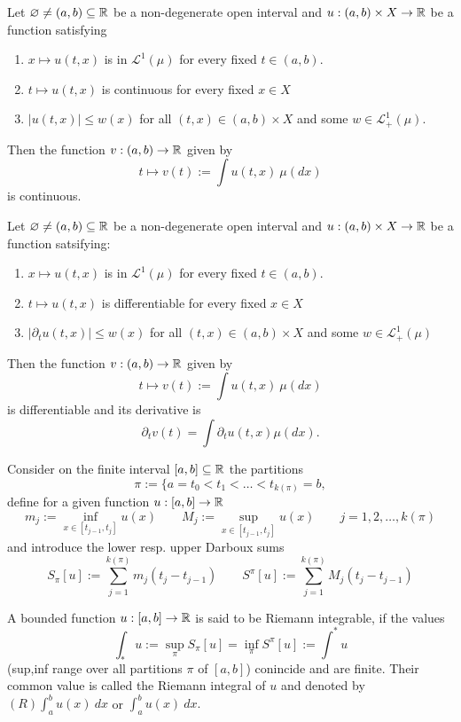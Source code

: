 \begin{thm}
Let \(\varnothing \neq (a,b)\subseteq \Bbb{R}\) be a non-degenerate open interval and \(u:(a,b)\times X\rightarrow  \Bbb{R}\) be a function satisfying

\begin{enumerate}
  \item \(x\mapsto  u (t,x)\) is in \(\mathcal{L}^1(\mu )\) for every fixed \(t\in (a,b)\).
  \item \(t\mapsto u(t,x)\) is continuous for every fixed \(x\in X\)
  \item \(|u(t,x)|\leq w(x)\) for all \((t,x)\in (a,b)\times X\) and some \(w\in \mathcal{L}_{+}^1(\mu ).\)
\end{enumerate}

Then the function \(v:(a,b)\rightarrow \Bbb{R}\) given by
\[
t\mapsto v(t):= \int  u(t,x)\  \mu (dx)
\]
is continuous.
\end{thm}

\begin{thm}
Let \(\varnothing  \neq  (a,b) \subseteq \Bbb{R}\) be a non-degenerate open interval and \(u : (a,b) \times X \rightarrow \Bbb{R}\) be a function satsifying:

\begin{enumerate}
  \item \(x\mapsto  u(t,x)\) is in \(\mathcal{L}^1(\mu )\) for every fixed \(t\in (a,b)\).
  \item \(t\mapsto u(t,x)\) is differentiable for every fixed \(x\in X\)
  \item \(|\partial _{t}u(t,x)|\leq w(x)\) for all \((t,x)\in (a,b) \times X\) and some \(w\in \mathcal{L}_{+}^1(\mu )\)
\end{enumerate}

Then the function \(v:(a,b)\rightarrow \Bbb{R}\) given by
\[
t\mapsto  v(t):= \int  u(t,x)\  \mu (dx)
\]
is differentiable and its derivative is
\[
\partial _{t} v(t) = \int  \partial _{t} u(t,x) \mu (dx).
\]
\end{thm}

\begin{defn}
Consider on the finite interval \([a,b]\subseteq \Bbb{R}\) the partitions
\[
\pi :=\{a=t_{0}<t_{1}<\ldots <t_{k(\pi )}=b,
\]
define for a given function \(u:[a,b]\rightarrow \Bbb{R}\)
\[
m_{j}:=\inf_{x\in [t_{j-1},t_{j}]} u(x) \qquad M_{j}:=\sup_{x\in [t_{j-1},t_{j}]} u(x) \qquad j=1,2,\ldots ,k(\pi )
\]
and introduce the lower resp. upper Darboux sums
\[
S_\pi [u] := \sum _{j=1}^{k(\pi )} m_{j} (t_{j}-t_{j-1}) \qquad S^\pi [u]:= \sum _{j=1}^{k(\pi )}M_{j}(t_{j}-t_{j-1})
\]
\end{defn}
\begin{defn}
A bounded function \(u:[a,b]\rightarrow \Bbb{R}\) is said to be Riemann integrable, if the values
\[
\int _*u:=\sup_{\pi }S_\pi [u] = \inf_{\pi }S^\pi [u]:=\int ^* u
\]
(sup,inf range over all partitions \(\pi \) of \([a,b]\)) conincide and are finite. Their common value is called the Riemann integral of \(u\) and denoted by \((R)\int _{a}^b u(x)\  dx\) or \(\int _{a}^b u(x)\  dx.\)
\end{defn}

